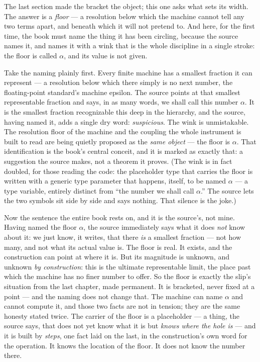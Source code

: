 The last section made the bracket the object; this one asks what sets its width. The answer is a \emph{floor} --- a
resolution below which the machine cannot tell any two terms apart, and beneath which it will not pretend to. And here,
for the first time, the book must name the thing it has been circling, because the source names it, and names it with a
wink that is the whole discipline in a single stroke: the floor is called \emph{$\alpha$}, and its value is not given.

Take the naming plainly first. Every finite machine has a smallest fraction it can represent --- a resolution below
which there simply is no next number, the floating-point standard's machine epsilon. The source points at that smallest
representable fraction and says, in as many words, we shall call this number $\alpha$. It is the smallest fraction
recognizable this deep in the hierarchy, and the source, having named it, adds a single dry word: \emph{suspicious}.
The wink is unmistakable. The resolution floor of the machine and the coupling the whole instrument is built to read
are being quietly proposed as the \emph{same object} --- the floor is $\alpha$. That identification is the book's
central conceit, and it is marked as exactly that: a suggestion the source makes, not a theorem it proves. (The wink is
in fact doubled, for those reading the code: the placeholder type that carries the floor is written with a generic type
parameter that happens, itself, to be named $\alpha$ --- a type variable, entirely distinct from ``the number we shall
call $\alpha$.'' The source lets the two symbols sit side by side and says nothing. That silence is the joke.)

Now the sentence the entire book rests on, and it is the source's, not mine. Having named the floor $\alpha$, the
source immediately says what it does \emph{not} know about it: we just know, it writes, that there \emph{is} a smallest
fraction --- not how many, and not what its actual value is. The floor is real. It exists, and the construction can
point at where it is. But its magnitude is unknown, and unknown \emph{by construction}: this is the ultimate
representable limit, the place past which the machine has no finer number to offer. So the floor is exactly the slip's
situation from the last chapter, made permanent. It is bracketed, never fixed at a point --- and the naming does not
change that. The machine can name $\alpha$ and cannot compute it, and those two facts are not in tension; they are the
same honesty stated twice. The carrier of the floor is a placeholder --- a thing, the source says, that does not yet
know what it is but \emph{knows where the hole is} --- and it is built by \emph{steps}, one fact laid on the last, in
the construction's own word for the operation. It knows the location of the floor. It does not know the number there.

